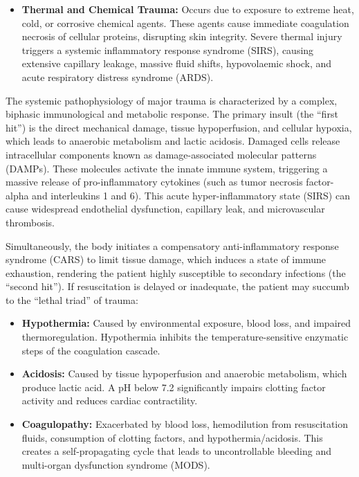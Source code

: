 \begin{itemize}
\begin{itemize}
        \item \textit{Secondary blast injuries} result from flying debris and shrapnel striking the victim, causing penetrating or lacerating trauma.
        \textit{Tertiary blast injuries} occur when the physical blast wind throws the victim against hard surfaces, leading to blunt injuries, fractures, and traumatic brain injury.
        \item \textit{Quaternary blast injuries} encompass all other injuries, including thermal burns, toxic gas inhalation, and radiation exposure.
    \end{itemize}
    \item \textbf{Thermal and Chemical Trauma:} Occurs due to exposure to extreme heat, cold, or corrosive chemical agents. These agents cause immediate coagulation necrosis of cellular proteins, disrupting skin integrity. Severe thermal injury triggers a systemic inflammatory response syndrome (SIRS), causing extensive capillary leakage, massive fluid shifts, hypovolaemic shock, and acute respiratory distress syndrome (ARDS).
\end{itemize}

The systemic pathophysiology of major trauma is characterized by a complex, biphasic immunological and metabolic response. The primary insult (the ``first hit'') is the direct mechanical damage, tissue hypoperfusion, and cellular hypoxia, which leads to anaerobic metabolism and lactic acidosis. Damaged cells release intracellular components known as damage-associated molecular patterns (DAMPs). These molecules activate the innate immune system, triggering a massive release of pro-inflammatory cytokines (such as tumor necrosis factor-alpha and interleukins 1 and 6). This acute hyper-inflammatory state (SIRS) can cause widespread endothelial dysfunction, capillary leak, and microvascular thrombosis.

Simultaneously, the body initiates a compensatory anti-inflammatory response syndrome (CARS) to limit tissue damage, which induces a state of immune exhaustion, rendering the patient highly susceptible to secondary infections (the ``second hit''). If resuscitation is delayed or inadequate, the patient may succumb to the ``lethal triad'' of trauma:
\begin{itemize}
    \item \textbf{Hypothermia:} Caused by environmental exposure, blood loss, and impaired thermoregulation. Hypothermia inhibits the temperature-sensitive enzymatic steps of the coagulation cascade.
    \item \textbf{Acidosis:} Caused by tissue hypoperfusion and anaerobic metabolism, which produce lactic acid. A pH below 7.2 significantly impairs clotting factor activity and reduces cardiac contractility.
    \item \textbf{Coagulopathy:} Exacerbated by blood loss, hemodilution from resuscitation fluids, consumption of clotting factors, and hypothermia/acidosis. This creates a self-propagating cycle that leads to uncontrollable bleeding and multi-organ dysfunction syndrome (MODS).
\end{itemize}

